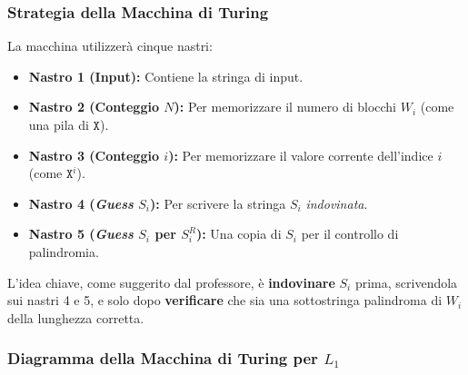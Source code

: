 \documentclass[a4paper]{article}
\theoremstyle{definition} %
\newcommand{\X}{\texttt{X}} %
\begin{document}
\subsubsection{Strategia della Macchina di Turing}
La macchina utilizzerà cinque nastri:
\begin{itemize}
    \item \textbf{Nastro 1 (Input):} Contiene la stringa di input.
    \item \textbf{Nastro 2 (Conteggio $N$):} Per memorizzare il numero di blocchi $W_i$ (come una pila di $\X$).
    \item \textbf{Nastro 3 (Conteggio $i$):} Per memorizzare il valore corrente dell'indice $i$ (come $\X^i$).
    \item \textbf{Nastro 4 (\textit{Guess} $S_i$):} Per scrivere la stringa $S_i$ \textit{indovinata}.
    \item \textbf{Nastro 5 (\textit{Guess} $S_i$ per $S_i^R$):} Una copia di $S_i$ per il controllo di palindromia.
\end{itemize}
L'idea chiave, come suggerito dal professore, è \textbf{indovinare} $S_i$ prima, scrivendola sui nastri 4 e 5, e solo dopo \textbf{verificare} che sia una sottostringa palindroma di $W_i$ della lunghezza corretta.

\subsubsection{Diagramma della Macchina di Turing per $L_1$}
\end{document}
